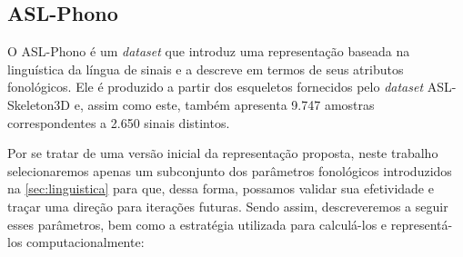 \subsection{ASL-Phono}
\label{sec:metodologia-datasets-phono}

O ASL-Phono é um \textit{dataset} que introduz uma representação baseada na linguística da língua de sinais e a descreve em termos de seus atributos fonológicos. Ele é produzido a partir dos esqueletos fornecidos pelo \textit{dataset} ASL-Skeleton3D e, assim como este, também apresenta 9.747 amostras correspondentes a 2.650 sinais distintos.

Por se tratar de uma versão inicial da representação proposta, neste trabalho selecionaremos apenas um subconjunto dos parâmetros fonológicos introduzidos na \autoref{sec:linguistica} para que, dessa forma, possamos validar sua efetividade e traçar uma direção para iterações futuras.
Sendo assim, descreveremos a seguir esses parâmetros, bem como a estratégia utilizada para calculá-los e representá-los computacionalmente:


